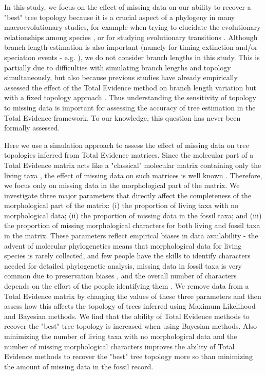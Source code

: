 \documentclass[12pt,letterpaper]{article}
\begin{document}
In this study, we focus on the effect of missing data on our ability to recover a "best" tree topology because it is a crucial aspect of a phylogeny in many macroevolutionary studies, for example when trying to elucidate the evolutionary relationships among species \citep[e.g.][]{meredithimpacts2011,jetzthe2012}, or for studying evolutionary transitions \citep[e.g.][]{friedmanexplosive2010}. Although branch length estimation is also important (namely for timing extinction and/or speciation events - e.g. \citealt{ronquista2012}), we do not consider branch lengths in this study. This is partially due to difficulties with simulating branch lengths and topology simultaneously, but also because previous studies have already empirically assessed the effect of the Total Evidence method on branch length variation but with a fixed topology approach \citep{ronquista2012,schragocombining2013,slaterphylogenetic2013,beckancient2014}. Thus understanding the sensitivity of topology to missing data is important for assessing the accuracy of tree estimation in the Total Evidence framework. To our knowledge, this question has never been formally assessed.

Here we use a simulation approach to assess the effect of missing data on tree topologies inferred from Total Evidence matrices. Since the molecular part of a Total Evidence matrix acts like a "classical" molecular matrix containing only the living taxa \citep{ronquista2012}, the effect of missing data on such matrices is well known \citep{wiensmissing2006,wiensmissing2008,rouresite-specific2011}. Therefore, we focus only on missing data in the morphological part of the matrix. We investigate three major parameters that directly affect the completeness of the morphological part of the matrix: (i) the proportion of living taxa with no morphological data; (ii) the proportion of missing data in the fossil taxa; and (iii) the proportion of missing morphological characters for both living and fossil taxa in the matrix. These parameters reflect empirical biases in data availability
- the advent of molecular phylogenetics means that morphological data for living species is rarely collected, and few people have the skills to identify characters needed for detailed phylogenetic analysis, missing data in fossil taxa is very common due to preservation biases \citep{sansomfossilization2013}, and the overall number of characters depends on the effort of the people identifying them \citep[e.g.][]{O'Leary08022013}. We remove data from a Total Evidence matrix by changing the values of these three parameters and then assess how this affects the topology of trees inferred using Maximum Likelihood and Bayesian methods. We find that the ability of Total Evidence methods to recover the "best" tree topology is increased when using Bayesian methods. Also minimizing the number of living taxa with no morphological data and the number of missing morphological characters improves the ability of Total Evidence methods to recover the "best" tree topology more so than minimizing the amount of missing data in the fossil record.
\end{document}
